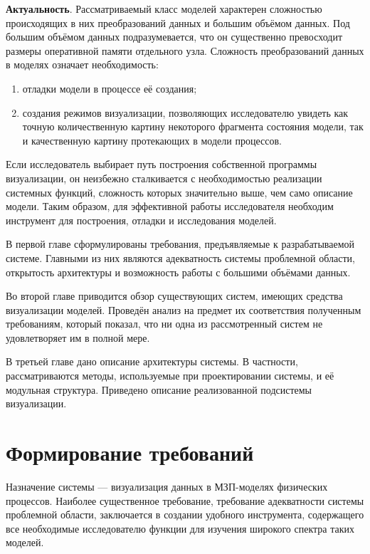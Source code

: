 \documentclass[a4paper,12pt]{extarticle}
\let\stdsection\section
\renewcommand\section{
    \newpage
    \stdsection
}
\begin{document}
\textbf{Актуальность}. Рассматриваемый класс моделей характерен сложностью происходящих в них преобразований данных и большим объёмом данных. Под большим объёмом данных подразумевается, что он существенно превосходит размеры оперативной памяти отдельного узла. Сложность преобразований данных в моделях означает необходимость:
\begin{enumerate}
    \item отладки модели в процессе её создания;
    \item создания режимов визуализации, позволяющих исследователю увидеть как точную количественную картину некоторого фрагмента состояния модели, так и качественную картину протекающих в модели процессов.
\end{enumerate}

Если исследователь выбирает путь построения собственной программы визуализации, он неизбежно сталкивается с необходимостью реализации системных функций, сложность которых значительно выше, чем само описание модели. Таким образом, для эффективной работы исследователя необходим инструмент для построения, отладки и исследования моделей.

В первой главе сформулированы требования, предъявляемые к разрабатываемой системе. Главными из них являются адекватность системы проблемной области, открытость архитектуры и возможность работы с большими объёмами данных.

Во второй главе приводится обзор существующих систем, имеющих средства визуализации моделей. Проведён анализ на предмет их соответствия полученным требованиям, который показал, что ни одна из рассмотренный систем не удовлетворяет им в полной мере.

В третьей главе дано описание архитектуры системы. В частности, рассматриваются методы, используемые при проектировании системы, и её модульная структура. Приведено описание реализованной подсистемы визуализации.




\section{Формирование требований}
\label{sec:requirements}

Назначение системы --- визуализация данных в МЗП-моделях физических процессов.  Наиболее существенное требование, требование адекватности системы проблемной области, заключается в создании удобного инструмента, содержащего все необходимые исследователю функции для изучения широкого спектра таких моделей.
\end{document}
